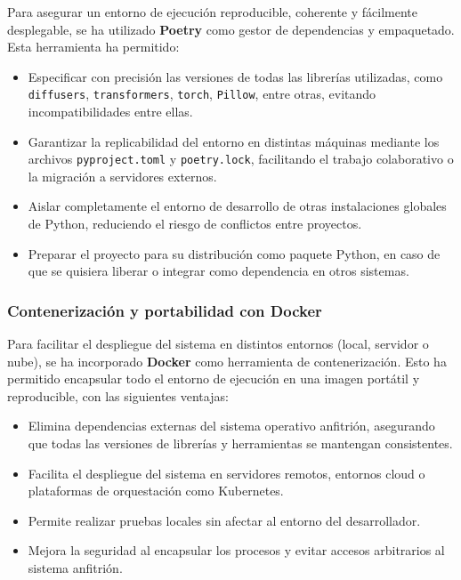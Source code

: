 Para asegurar un entorno de ejecución reproducible, coherente y fácilmente desplegable, se ha utilizado \textbf{Poetry} como gestor de dependencias y empaquetado. Esta herramienta ha permitido:

\begin{itemize}
    \item Especificar con precisión las versiones de todas las librerías utilizadas, como \texttt{diffusers}, \texttt{transformers}, \texttt{torch}, \texttt{Pillow}, entre otras, evitando incompatibilidades entre ellas.
    \item Garantizar la replicabilidad del entorno en distintas máquinas mediante los archivos \texttt{pyproject.toml} y \texttt{poetry.lock}, facilitando el trabajo colaborativo o la migración a servidores externos.
    \item Aislar completamente el entorno de desarrollo de otras instalaciones globales de Python, reduciendo el riesgo de conflictos entre proyectos.
    \item Preparar el proyecto para su distribución como paquete Python, en caso de que se quisiera liberar o integrar como dependencia en otros sistemas.
\end{itemize}

\subsubsection{Contenerización y portabilidad con Docker}

Para facilitar el despliegue del sistema en distintos entornos (local, servidor o nube), se ha incorporado \textbf{Docker} como herramienta de contenerización. Esto ha permitido encapsular todo el entorno de ejecución en una imagen portátil y reproducible, con las siguientes ventajas:

\begin{itemize}
    \item Elimina dependencias externas del sistema operativo anfitrión, asegurando que todas las versiones de librerías y herramientas se mantengan consistentes.
    \item Facilita el despliegue del sistema en servidores remotos, entornos cloud o plataformas de orquestación como Kubernetes.
    \item Permite realizar pruebas locales sin afectar al entorno del desarrollador.
    \item Mejora la seguridad al encapsular los procesos y evitar accesos arbitrarios al sistema anfitrión.
\end{itemize}

